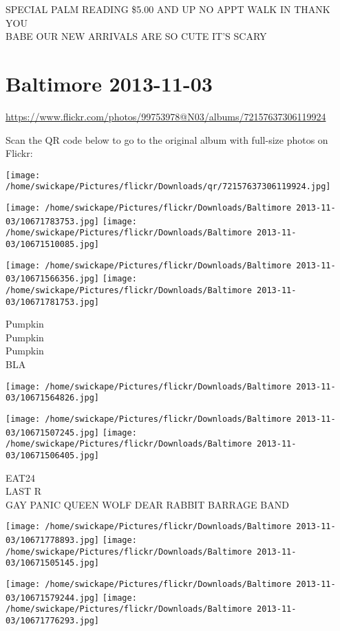 \documentclass[10pt,letterpaper]{article}
\begin{document}
SPECIAL PALM READING \$5.00 AND UP NO APPT WALK IN THANK YOU\\
BABE OUR NEW ARRIVALS ARE SO CUTE IT'S SCARY
\pagebreak

\section*{Baltimore 2013-11-03}

\url{https://www.flickr.com/photos/99753978@N03/albums/72157637306119924}

Scan the QR code below to go to the original album with full-size photos on Flickr:

\texttt{[image: /home/swickape/Pictures/flickr/Downloads/qr/72157637306119924.jpg]}
\pagebreak

\texttt{[image: /home/swickape/Pictures/flickr/Downloads/Baltimore 2013-11-03/10671783753.jpg]}
\texttt{[image: /home/swickape/Pictures/flickr/Downloads/Baltimore 2013-11-03/10671510085.jpg]}

\texttt{[image: /home/swickape/Pictures/flickr/Downloads/Baltimore 2013-11-03/10671566356.jpg]}
\texttt{[image: /home/swickape/Pictures/flickr/Downloads/Baltimore 2013-11-03/10671781753.jpg]}

Pumpkin\\
Pumpkin\\
Pumpkin\\
BLA
\pagebreak

\texttt{[image: /home/swickape/Pictures/flickr/Downloads/Baltimore 2013-11-03/10671564826.jpg]}

\vspace{0.25in}
\texttt{[image: /home/swickape/Pictures/flickr/Downloads/Baltimore 2013-11-03/10671507245.jpg]}
\texttt{[image: /home/swickape/Pictures/flickr/Downloads/Baltimore 2013-11-03/10671506405.jpg]}

EAT24\\
LAST R\\
GAY PANIC QUEEN WOLF DEAR RABBIT BARRAGE BAND
\pagebreak

\texttt{[image: /home/swickape/Pictures/flickr/Downloads/Baltimore 2013-11-03/10671778893.jpg]}
\texttt{[image: /home/swickape/Pictures/flickr/Downloads/Baltimore 2013-11-03/10671505145.jpg]}

\texttt{[image: /home/swickape/Pictures/flickr/Downloads/Baltimore 2013-11-03/10671579244.jpg]}
\texttt{[image: /home/swickape/Pictures/flickr/Downloads/Baltimore 2013-11-03/10671776293.jpg]}
\end{document}

